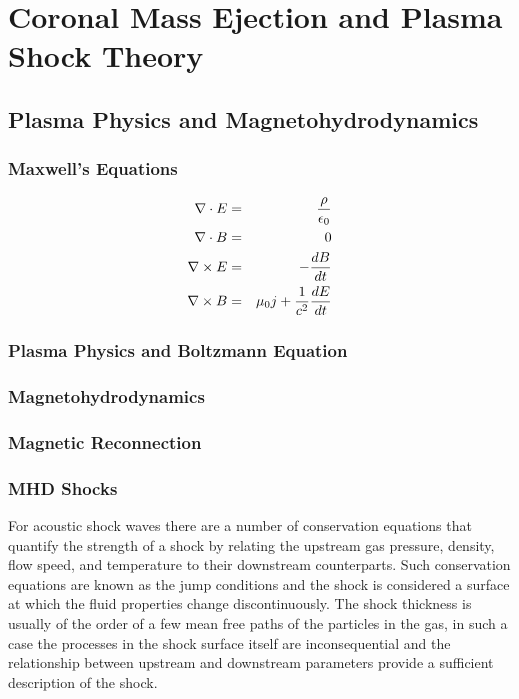 \chapter{Coronal Mass Ejection and Plasma Shock Theory} 
\label{chap:2}

\section{Plasma Physics and Magnetohydrodynamics}\label{sec:1}

\subsection{Maxwell's Equations}\label{sec:10}

\begin{eqnarray}
\nabla \cdot E &=& \frac{\rho}{\epsilon_0} \\
\nabla \cdot B &=& 0 \\
{\bf \nabla} \times{E} &=& - \frac{dB}{dt} \\
{\bf \nabla} \times{B} &=& \mu_0 j + \frac{1}{c^2}\frac{dE}{dt} 
\end{eqnarray}



\subsection{Plasma Physics and Boltzmann Equation}\label{sec:11}

\subsection{Magnetohydrodynamics}\label{sec:12}

\subsection{Magnetic Reconnection}\label{sec:13}

\subsection{MHD Shocks}\label{sec:14}

For acoustic shock waves there are a number of conservation equations that quantify the strength of a shock by relating the upstream gas pressure, density, flow speed, and temperature to their downstream counterparts. Such conservation equations are known as the jump conditions and the shock is considered a surface at which the fluid properties change discontinuously. The shock thickness is usually of the order of a few mean free paths of the particles in the gas, in such a case the processes in the shock surface itself are inconsequential and the relationship between upstream and downstream parameters provide a sufficient description of the shock. 

